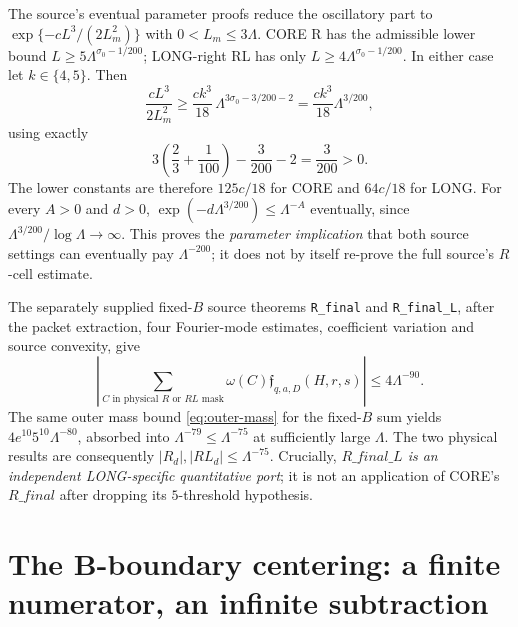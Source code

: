 \documentclass[11pt]{article}
\newcommand{\Lam}{\Lambda}
\newcommand{\omegaR}{\omega}
\newcommand{\F}{\mathfrak f}
\theoremstyle{definition}
\theoremstyle{remark}
\newcommand{\1}{\mathbf 1}
\begin{document}
The source's eventual parameter proofs reduce the oscillatory
part to $\exp\{-cL^3/(2L_m^2)\}$ with
$0<L_m\le3\Lam$. CORE R has the admissible lower bound
$L\ge5\Lam^{\sigma_0-1/200}$; LONG-right RL has only
$L\ge4\Lam^{\sigma_0-1/200}$. In either case let
$k\in\{4,5\}$. Then
\begin{equation}\label{eq:vk-lower}
 \frac{cL^3}{2L_m^2}
 \ge\frac{ck^3}{18}\,
 \Lam^{3\sigma_0-3/200-2}
 =\frac{ck^3}{18}\Lam^{3/200},
\end{equation}
using exactly
\begin{equation}\label{eq:positive-margin}
 3\left(\frac23+\frac1{100}\right)-\frac3{200}-2
 =\frac3{200}>0.
\end{equation}
The lower constants are therefore $125c/18$ for CORE
and $64c/18$ for LONG. For every $A>0$ and $d>0$,
$\exp(-d\Lam^{3/200})\le\Lam^{-A}$ eventually,
since $\Lam^{3/200}/\log\Lam\to\infty$.
This proves the \emph{parameter implication} that both
source settings can eventually pay $\Lam^{-200}$;
it does not by itself re-prove the full source's $R$-cell
estimate.

The separately supplied fixed-$B$ source theorems
\texttt{R\_final} and \texttt{R\_final\_L}, after the
packet extraction, four Fourier-mode estimates, coefficient
variation and source convexity, give
\begin{equation}\label{eq:r-fixed-B}
 \left|\sum_{C\text{ in physical }R\text{ or }RL\text{ mask}}
     \omegaR(C)\F_{q,a,D}(H,r,s)\right|
 \le4\Lam^{-90}.
\end{equation}
The same outer mass bound \eqref{eq:outer-mass} for the
fixed-$B$ sum yields
$4e^{10}5^{10}\Lam^{-80}$, absorbed into
$\Lam^{-79}\le\Lam^{-75}$ at sufficiently large $\Lam$.
The two physical results are consequently
$|R_d|,|RL_d|\le\Lam^{-75}$.
Crucially, \emph{$R\_final\_L$ is an independent LONG-specific
quantitative port}; it is not an application of CORE's
$R\_final$ after dropping its $5$-threshold hypothesis.

\section{The B-boundary centering: a finite numerator, an infinite subtraction}
\label{sec:centering}
\end{document}
